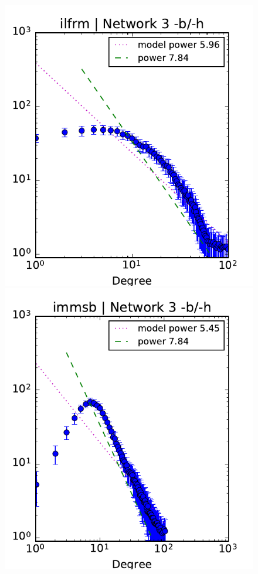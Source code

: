 \begin{figure}[h]
	\endminipage
	\vspace{-0.4cm}
	\includegraphics[scale=0.4]{img/ilfrm_g3_d}
	\endminipage
	\includegraphics[scale=0.4]{img/immsb_g3_d}

\end{figure}
